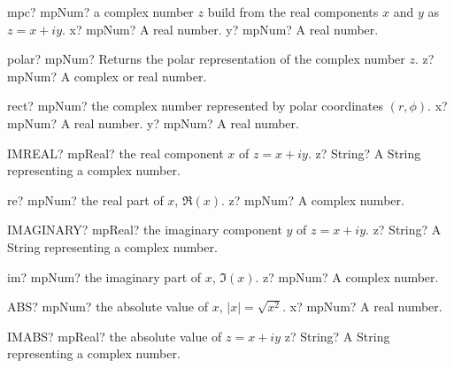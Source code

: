 \documentclass[12pt,a4paper,openany]{book}
\begin{document}
\begin{mpFunctionsExtract}
\mpFunctionTwo
{mpc? mpNum? a complex number $z$ build from the real components $x$ and $y$ as $z=x+iy$.}
{x? mpNum? A real number.}
{y? mpNum? A real number.}
\end{mpFunctionsExtract}

\begin{mpFunctionsExtract}
\mpFunctionOne
{polar? mpNum? Returns the polar representation of the complex number $z$.}
{z? mpNum? A complex or real number.}
\end{mpFunctionsExtract}

\begin{mpFunctionsExtract}
\mpFunctionTwo
{rect? mpNum? the complex number represented by polar coordinates $(r,\phi)$.}
{x? mpNum? A real number.}
{y? mpNum? A real number.}
\end{mpFunctionsExtract}

\begin{mpFunctionsExtract}
\mpWorksheetFunctionOneNotImplemented
{IMREAL? mpReal? the real component $x$ of $z=x+iy$.}
{z? String? A String representing a complex number.}
\end{mpFunctionsExtract}

\begin{mpFunctionsExtract}
\mpFunctionOne
{re? mpNum? the real part of $x$, $\Re(x)$.}
{z? mpNum? A complex number.}
\end{mpFunctionsExtract}

\begin{mpFunctionsExtract}
\mpWorksheetFunctionOneNotImplemented
{IMAGINARY? mpReal? the imaginary component $y$ of $z=x+iy$.}
{z? String? A String representing a complex number.}
\end{mpFunctionsExtract}

\begin{mpFunctionsExtract}
\mpFunctionOne
{im? mpNum? the imaginary part of $x$, $\Im(x)$.}
{z? mpNum? A complex number.}
\end{mpFunctionsExtract}

\begin{mpFunctionsExtract}
\mpWorksheetFunctionOneNotImplemented
{ABS? mpNum? the absolute value of $x$, $|x| = \sqrt{x^2}$.}
{x? mpNum? A real number.}
\end{mpFunctionsExtract}

\begin{mpFunctionsExtract}
\mpWorksheetFunctionOneNotImplemented
{IMABS? mpReal? the absolute value of $z=x+iy$}
{z? String? A String representing a complex number.}
\end{mpFunctionsExtract}
\end{document}
